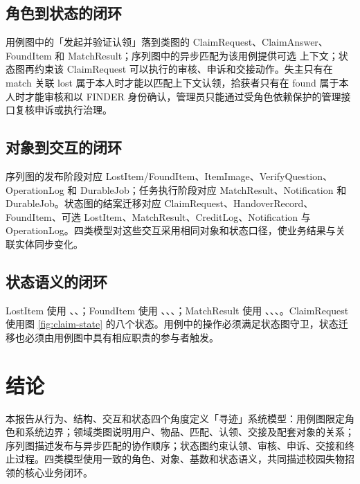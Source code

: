 \subsection{角色到状态的闭环}

用例图中的「发起并验证认领」落到类图的 ClaimRequest、ClaimAnswer、FoundItem 和 MatchResult；序列图中的异步匹配为该用例提供可选  上下文；状态图再约束该 ClaimRequest 可以执行的审核、申诉和交接动作。失主只有在 match 关联 lost 属于本人时才能以匹配上下文认领，拾获者只有在 found 属于本人时才能审核和以 FINDER 身份确认，管理员只能通过受角色依赖保护的管理接口复核申诉或执行治理。

\subsection{对象到交互的闭环}

序列图的发布阶段对应 LostItem/FoundItem、ItemImage、VerifyQuestion、OperationLog 和 DurableJob；任务执行阶段对应 MatchResult、Notification 和 DurableJob。状态图的结案迁移对应 ClaimRequest、HandoverRecord、FoundItem、可选 LostItem、MatchResult、CreditLog、Notification 与 OperationLog。四类模型对这些交互采用相同对象和状态口径，使业务结果与关联实体同步变化。

\subsection{状态语义的闭环}

LostItem 使用 、、；FoundItem 使用 、、、；MatchResult 使用 、、、。ClaimRequest 使用图 \ref{fig:claim-state} 的八个状态。用例中的操作必须满足状态图守卫，状态迁移也必须由用例图中具有相应职责的参与者触发。

\section{结论}

本报告从行为、结构、交互和状态四个角度定义「寻迹」系统模型：用例图限定角色和系统边界；领域类图说明用户、物品、匹配、认领、交接及配套对象的关系；序列图描述发布与异步匹配的协作顺序；状态图约束认领、审核、申诉、交接和终止过程。四类模型使用一致的角色、对象、基数和状态语义，共同描述校园失物招领的核心业务闭环。

